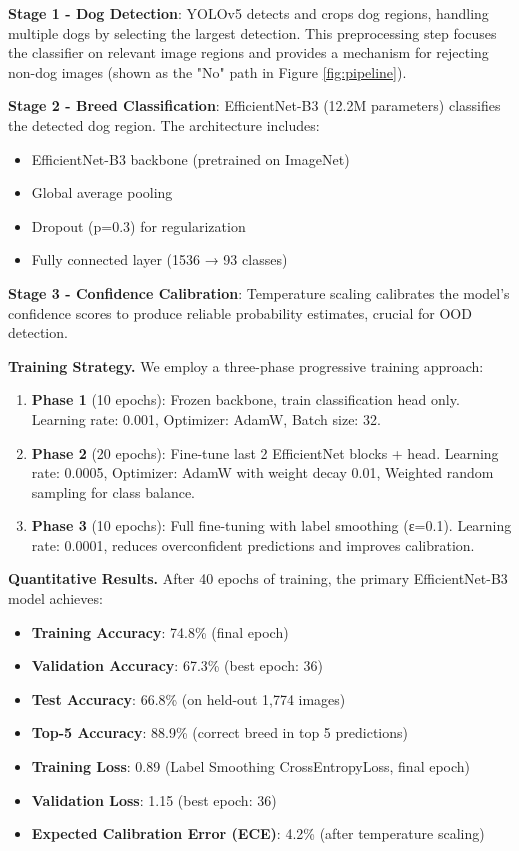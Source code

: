 \documentclass[final]{article}
\begin{document}
\textbf{Stage 1 - Dog Detection}: YOLOv5 detects and crops dog regions, handling multiple dogs by selecting the largest detection. This preprocessing step focuses the classifier on relevant image regions and provides a mechanism for rejecting non-dog images (shown as the "No" path in Figure \ref{fig:pipeline}).

\textbf{Stage 2 - Breed Classification}: EfficientNet-B3 (12.2M parameters) classifies the detected dog region. The architecture includes:
\begin{itemize}
    \item EfficientNet-B3 backbone (pretrained on ImageNet)
    \item Global average pooling
    \item Dropout (p=0.3) for regularization
    \item Fully connected layer (1536 → 93 classes)
\end{itemize}

\textbf{Stage 3 - Confidence Calibration}: Temperature scaling calibrates the model's confidence scores to produce reliable probability estimates, crucial for OOD detection.

\textbf{Training Strategy.} We employ a three-phase progressive training approach:
\begin{enumerate}
    \item \textbf{Phase 1} (10 epochs): Frozen backbone, train classification head only. Learning rate: 0.001, Optimizer: AdamW, Batch size: 32.
    
    \item \textbf{Phase 2} (20 epochs): Fine-tune last 2 EfficientNet blocks + head. Learning rate: 0.0005, Optimizer: AdamW with weight decay 0.01, Weighted random sampling for class balance.
    
    \item \textbf{Phase 3} (10 epochs): Full fine-tuning with label smoothing (ε=0.1). Learning rate: 0.0001, reduces overconfident predictions and improves calibration.
\end{enumerate}

\textbf{Quantitative Results.} After 40 epochs of training, the primary EfficientNet-B3 model achieves:

\begin{itemize}
    \item \textbf{Training Accuracy}: 74.8\% (final epoch)
    \item \textbf{Validation Accuracy}: 67.3\% (best epoch: 36)
    \item \textbf{Test Accuracy}: 66.8\% (on held-out 1,774 images)
    \item \textbf{Top-5 Accuracy}: 88.9\% (correct breed in top 5 predictions)
    \item \textbf{Training Loss}: 0.89 (Label Smoothing CrossEntropyLoss, final epoch)
    \item \textbf{Validation Loss}: 1.15 (best epoch: 36)
    \item \textbf{Expected Calibration Error (ECE)}: 4.2\% (after temperature scaling)
\end{itemize}
\end{document}
